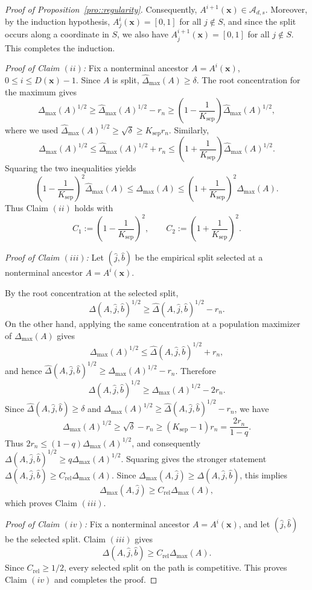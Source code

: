 \documentclass[11pt]{article}
\theoremstyle{plain}
\theoremstyle{definition}
\theoremstyle{remark}
\theoremstyle{plain}
\newcommand{\bx}{\mathbf{x}}
\newcommand{\1}{\mathbbm{1}}
\begin{document}
\begin{proof}[Proof of Proposition~\ref{pro::regularity}]
Consequently, $A^{i+1}(\bx)\in\mathcal A_{d,s}$. Moreover, by the
induction hypothesis, $A_j^i(\bx)=[0,1]$ for all $j\notin S$, and since
the split occurs along a coordinate in $S$, we also have
$A_j^{i+1}(\bx)=[0,1]$ for all $j\notin S$. This completes the induction.

\smallskip
\noindent
\textit{Proof of Claim $(ii)$:}
Fix a nonterminal ancestor $A=A^i(\bx)$, $0\le i\le D(\bx)-1$.
Since $A$ is split, $\widehat\Delta_{\max}(A)\ge\delta$. The root
concentration for the maximum gives
\[
\Delta_{\max}(A)^{1/2}
\ge
\widehat\Delta_{\max}(A)^{1/2}-r_n
\ge
\left(1-\frac1{K_{\mathrm{sep}}}\right)
\widehat\Delta_{\max}(A)^{1/2},
\]
where we used $\widehat\Delta_{\max}(A)^{1/2}\ge\sqrt\delta\ge K_{\mathrm{sep}} r_n$.
Similarly,
\[
\Delta_{\max}(A)^{1/2}
\le
\widehat\Delta_{\max}(A)^{1/2}+r_n
\le
\left(1+\frac1{K_{\mathrm{sep}}}\right)
\widehat\Delta_{\max}(A)^{1/2}.
\]
Squaring the two inequalities yields
\[
\left(1-\frac1{K_{\mathrm{sep}}}\right)^2\widehat\Delta_{\max}(A)
\le
\Delta_{\max}(A)
\le
\left(1+\frac1{K_{\mathrm{sep}}}\right)^2\widehat\Delta_{\max}(A).
\]
Thus Claim $(ii)$ holds with
\[
C_1:=\left(1-\frac1{K_{\mathrm{sep}}}\right)^2,
\qquad
C_2:=\left(1+\frac1{K_{\mathrm{sep}}}\right)^2.
\]

\smallskip
\noindent
\textit{Proof of Claim $(iii)$:}
Let $(\hat j,\hat b)$ be the empirical split selected at a nonterminal
ancestor $A=A^i(\bx)$.

By the root concentration at the selected split,
\[
\Delta(A,\hat j,\hat b)^{1/2}
\ge
\widehat\Delta(A,\hat j,\hat b)^{1/2}-r_n.
\]
On the other hand, applying the same concentration at a population
maximizer of $\Delta_{\max}(A)$ gives
\[
\Delta_{\max}(A)^{1/2}\le \widehat\Delta(A,\hat j,\hat b)^{1/2}+r_n,
\]
and hence $\widehat\Delta(A,\hat j,\hat b)^{1/2}\ge \Delta_{\max}(A)^{1/2}-r_n$. Therefore
\[
\Delta(A,\hat j,\hat b)^{1/2}
\ge
\Delta_{\max}(A)^{1/2}-2r_n.
\]
Since $\widehat\Delta(A,\hat j,\hat b)\ge\delta$ and $\Delta_{\max}(A)^{1/2}\ge \widehat\Delta(A,\hat j,\hat b)^{1/2}-r_n$, we have
\[
\Delta_{\max}(A)^{1/2}
\ge
\sqrt{\delta}-r_n
\ge
(K_{\mathrm{sep}}-1)r_n
=
\frac{2r_n}{1-q}.
\]
Thus $2r_n\le (1-q)\Delta_{\max}(A)^{1/2}$, and consequently $
\Delta(A,\hat j,\hat b)^{1/2}
\ge
q\Delta_{\max}(A)^{1/2}$.
Squaring gives the stronger statement $
\Delta(A,\hat j,\hat b)
\ge
C_{\mathrm{rel}}\Delta_{\max}(A)$.
Since $\Delta_{\max}(A,\hat j)\ge \Delta(A,\hat j,\hat b)$, this implies
\[
\Delta_{\max}(A,\hat j)
\ge
C_{\mathrm{rel}}\Delta_{\max}(A),
\]
which proves Claim $(iii)$.

\smallskip
\noindent
\textit{Proof of Claim $(iv)$:}
Fix a nonterminal ancestor $A=A^i(\bx)$, and let $(\hat j,\hat b)$ be the selected split. Claim $(iii)$ gives
\[
\Delta(A,\hat j,\hat b)\ge C_{\mathrm{rel}}\Delta_{\max}(A).
\]
Since $C_{\mathrm{rel}}\ge1/2$, every selected split on the path is competitive. This proves Claim $(iv)$ and completes the proof.
\end{proof}
\end{document}
